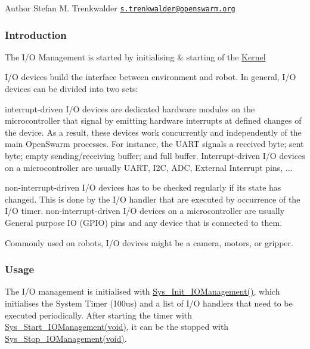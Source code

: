 \begin{DoxyAuthor}{Author}
Stefan M. Trenkwalder \href{mailto:s.trenkwalder@openswarm.org}{\tt s.\+trenkwalder@openswarm.\+org}
\end{DoxyAuthor}
\hypertarget{group__io_io_intro}{}\subsubsection{Introduction}\label{group__io_io_intro}
The I/\+O Management is started by initialising \& starting of the \hyperlink{group__base}{Kernel}

I/\+O devices build the interface between environment and robot. In general, I/\+O devices can be divided into two sets\+:
\begin{DoxyItemize}
\item interrupt-\/driven I/\+O devices are dedicated hardware modules on the microcontroller that signal by emitting hardware interrupts at defined changes of the device. As a result, these devices work concurrently and independently of the main Open\+Swarm processes. For instance, the U\+A\+R\+T signals a received byte; sent byte; empty sending/receiving buffer; and full buffer. Interrupt-\/driven I/\+O devices on a microcontroller are usually U\+A\+R\+T, I2\+C, A\+D\+C, External Interrupt pins, ...
\item non-\/interrupt-\/driven I/\+O devices has to be checked regularly if its state has changed. This is done by the I/\+O handler that are executed by occurrence of the I/\+O timer. non-\/interrupt-\/driven I/\+O devices on a microcontroller are usually General purpose I\+O (G\+P\+I\+O) pins and any device that is connected to them.
\end{DoxyItemize}

Commonly used on robots, I/\+O devices might be a camera, motors, or gripper.\hypertarget{group__io_io_usage}{}\subsubsection{Usage}\label{group__io_io_usage}
The I/\+O management is initialised with \hyperlink{io_8h_ad1719208a5855f34e056a8114de973f9}{Sys\+\_\+\+Init\+\_\+\+I\+O\+Management()}, which initialises the System Timer (100us) and a list of I/\+O handlers that need to be executed periodically. After starting the timer with \hyperlink{io_8h_a6ca66df90d159586d58a19e01f3a7025}{Sys\+\_\+\+Start\+\_\+\+I\+O\+Management(void)}, it can be the stopped with \hyperlink{io_8h_a14d9a8f941c03184049f3bf18d35fb47}{Sys\+\_\+\+Stop\+\_\+\+I\+O\+Management(void)}.

